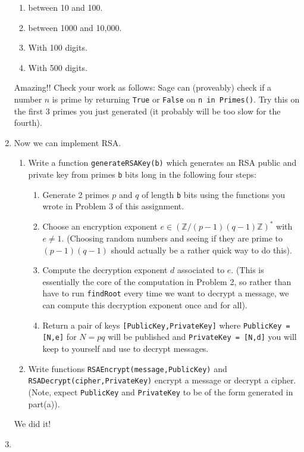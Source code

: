 \documentclass[11pt]{article}
\newcommand{\bZ}{\mathbb{Z}}
\begin{document}
\begin{enumerate}
{\begin{enumerate}
{\begin{enumerate}
      \item{between 10 and 100.}
      \item{between 1000 and 10,000.}
      \item{With 100 digits.}
      \item{With 500 digits.}
    \end{enumerate}
    Amazing!!  Check your work as follows: Sage can (proveably) check if a number $n$ is prime by returning \verb|True| or \verb|False| on \verb|n in Primes()|.  Try this on the first 3 primes you just generated (it probably will be too slow for the fourth).
    }
  \end{enumerate}
  }
  \item{
  Now we can implement RSA.
  \begin{enumerate}
    \item{
    Write a function \verb|generateRSAKey(b)| which generates an RSA public and private key from primes \verb|b| bits long in the following four steps:
    \begin{enumerate}[(1)]
      \item{
      Generate 2 primes $p$ and $q$ of length \verb|b| bits using the functions you wrote in Problem 3 of this assignment.
      }
      \item{
      Choose an encryption exponent $e\in(\bZ/(p-1)(q-1)\bZ)^*$ with $e\not=1$.  (Choosing random numbers and seeing if they are prime to $(p-1)(q-1)$ should actually be a rather quick way to do this).
      }
      \item{
      Compute the decryption exponent $d$ associated to $e$.  (This is essentially the core of the computation in Problem 2, so rather than have to run \verb|findRoot| every time we want to decrypt a message, we can compute this decryption exponent once and for all).
      }
      \item{
      Return a pair of keys \verb|[PublicKey,PrivateKey]| where \verb|PublicKey = [N,e]| for $N=pq$ will be published and \verb|PrivateKey = [N,d]| you will keep to yourself and use to decrypt messages.
      }
    \end{enumerate}
    }
    \item{
    Write functions \verb|RSAEncrypt(message,PublicKey)| and \verb|RSADecrypt(cipher,PrivateKey)| encrypt a message or decrypt a cipher.  (Note, expect \verb|PublicKey| and \verb|PrivateKey| to be of the form generated in part(a)).
    }
  \end{enumerate}
  }
  We did it!
  \item{
}
\end{enumerate}
\end{document}
